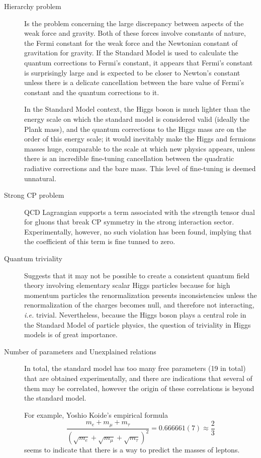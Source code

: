 \begin{description}
	\item[Hierarchy problem] Is the problem concerning the large discrepancy between aspects of the weak force and gravity. Both of these forces involve constants of nature, the Fermi constant for the weak force and the Newtonian constant of gravitation for gravity. If the Standard Model is used to calculate the quantum corrections to Fermi's constant, it appears that Fermi's constant is surprisingly large and is expected to be closer to Newton's constant unless there is a delicate cancellation between the bare value of Fermi's constant and the quantum corrections to it. 
	
	In the Standard Model context, the Higgs boson is much lighter than the energy scale on which the standard model is considered valid (ideally the Plank mass), and the quantum corrections to the Higgs mass are on the order of this energy scale; it would inevitably make the Higgs and fermions masses huge, comparable to the scale at which new physics appears, unless there is an incredible fine-tuning cancellation between the quadratic radiative corrections and the bare mass. This level of fine-tuning is deemed unnatural.
	\item[Strong CP problem] QCD Lagrangian supports a term associated with the strength tensor dual for gluons that break CP symmetry in the strong interaction sector. Experimentally, however, no such violation has been found, implying that the coefficient of this term is fine tunned to zero. 
	\item[Quantum triviality] Suggests that it may not be possible to create a consistent quantum field theory involving elementary scalar Higgs particles because for high momentum particles the renormalization presents inconsistencies unless the renormalization of the charges becomes null, and therefore not interacting, \textit{i.e.} trivial. Nevertheless, because the Higgs boson plays a central role in the Standard Model of particle physics, the question of triviality in Higgs models is of great importance. 
	\item[Number of parameters and Unexplained relations] In total, the standard model has too many free parameters (19 in total) that are obtained experimentally, and there are indications that several of them may be correlated, however the origin of these correlations is beyond the standard model.
	
	For example, Yoshio Koide's empirical formula \cite{0505220}
	$$
	\frac{m_{e}+m_{\mu}+m_{\tau}}{\left(\sqrt{m_{e}}+\sqrt{m_{\mu}}+\sqrt{m_{\tau}}\right)^{2}}=0.666661(7) \approx \frac{2}{3}
	$$
	seems to indicate that there is a way to predict the masses of leptons.
	
\end{description}
